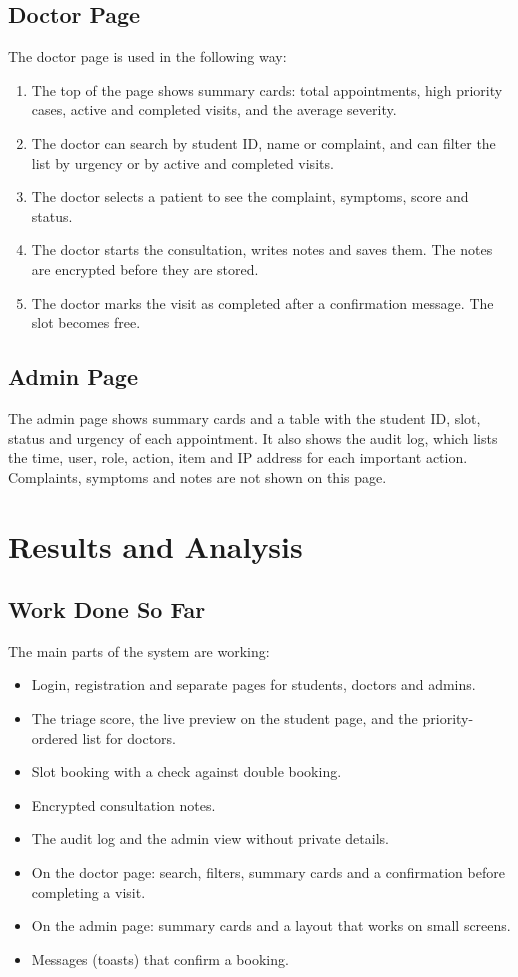 \documentclass[12pt,a4paper]{article}
\begin{document}
\subsection{Doctor Page}
The doctor page is used in the following way:
\begin{enumerate}
  \item The top of the page shows summary cards: total appointments, high priority cases, active and completed visits, and the average severity.
  \item The doctor can search by student ID, name or complaint, and can filter the list by urgency or by active and completed visits.
  \item The doctor selects a patient to see the complaint, symptoms, score and status.
  \item The doctor starts the consultation, writes notes and saves them. The notes are encrypted before they are stored.
  \item The doctor marks the visit as completed after a confirmation message. The slot becomes free.
\end{enumerate}


\subsection{Admin Page}
The admin page shows summary cards and a table with the student ID, slot, status and urgency of each appointment. It also shows the audit log, which lists the time, user, role, action, item and IP address for each important action. Complaints, symptoms and notes are not shown on this page.


\section{Results and Analysis}

\subsection{Work Done So Far}
The main parts of the system are working:
\begin{itemize}
  \item Login, registration and separate pages for students, doctors and admins.
  \item The triage score, the live preview on the student page, and the priority-ordered list for doctors.
  \item Slot booking with a check against double booking.
  \item Encrypted consultation notes.
  \item The audit log and the admin view without private details.
  \item On the doctor page: search, filters, summary cards and a confirmation before completing a visit.
  \item On the admin page: summary cards and a layout that works on small screens.
  \item Messages (toasts) that confirm a booking.
\end{itemize}
\end{document}
